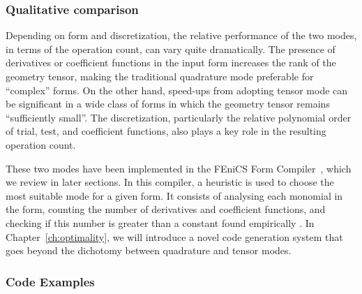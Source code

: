 \subsubsection{Qualitative comparison}
Depending on form and discretization, the relative performance of the two modes, in terms of the operation count, can vary quite dramatically. The presence of derivatives or coefficient functions in the input form increases the rank of the geometry tensor, making the traditional quadrature mode preferable for ``complex'' forms. On the other hand, speed-ups from adopting tensor mode can be significant in a wide class of forms in which the geometry tensor remains ``sufficiently small''. The discretization, particularly the relative polynomial order of trial, test, and coefficient functions, also plays a key role in the resulting operation count. 

These two modes have been implemented in the FEniCS Form Compiler~\citep{FFC-TC}, which we review in later sections. In this compiler, a heuristic is used to choose the most suitable mode for a given form. It consists of analysing each monomial in the form, counting the number of derivatives and coefficient functions, and checking if this number is greater than a constant found empirically \citep{Fenics}. In Chapter~\ref{ch:optimality}, we will introduce a novel code generation system that goes beyond the dichotomy between quadrature and tensor modes.


\subsubsection{Code Examples}
\label{sec:bkg:mathcode}

